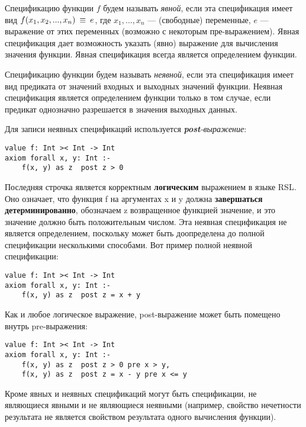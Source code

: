 

Спецификацию функции $f$ будем называть \emph{явной}, если эта спецификация имеет вид $f(x_1, x_2, ..., x_n) ~\mathop{\equiv}~ e$, где $x_1, ..., x_n$ --- (свободные) переменные, $e$ --- выражение от этих переменных (возможно с некоторым пре-выражением). Явная спецификация дает возможность указать (явно) выражение для вычисления значения функции. Явная спецификация всегда является определением функции.

Спецификацию функции будем называть \emph{неявной}, если эта спецификация имеет вид предиката от значений входных и выходных значений функции. Неявная спецификация является определением функции только в том случае, если предикат однозначно разрешается в значения выходных данных.

Для записи неявных спецификаций используется \emph{\textbf{post}-выражение}:
\begin{lstlisting}
value f: Int >< Int -> Int
axiom forall x, y: Int :-
    f(x, y) as z  post z > 0
\end{lstlisting}
Последняя строчка является корректным \textbf{логическим} выражением в языке RSL. Оно означает, что функция f на аргументах x и y должна \textbf{завершаться детерминированно}, обозначаем z возвращенное функцией значение, и это значение должно быть положительным числом. Эта неявная спецификация не является определением, поскольку может быть доопределена до полной спецификации несколькими способами. Вот пример полной неявной спецификации:
\begin{lstlisting}
value f: Int >< Int -> Int
axiom forall x, y: Int :-
    f(x, y) as z  post z = x + y
\end{lstlisting}
Как и любое логическое выражение, post-выражение может быть помещено внутрь pre-выражения:
\begin{lstlisting}
value f: Int >< Int -> Int
axiom forall x, y: Int :-
    f(x, y) as z  post z > 0 pre x > y,
    f(x, y) as z  post z = x - y pre x <= y
\end{lstlisting}

Кроме явных и неявных спецификаций могут быть спецификации, не являющиеся явными и не являющиеся неявными (например, свойство нечетности результата не является свойством результата одного вычисления функции).

